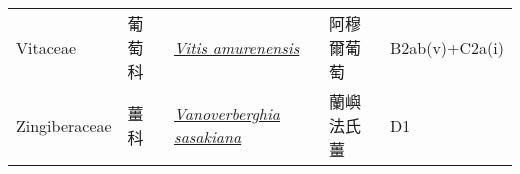 {\begin{longtable}{p{2.5cm}p{2.5cm}p{4.5cm}p{2.5cm}p{3cm}}
    Vitaceae & 葡萄科 & \href{http://www.theplantlist.org/tpl1.1/search?q=Vitis+amurenensis}{\textit{Vitis amurenensis} } & 阿穆爾葡萄 & B2ab(v)+C2a(i) \index{Vitis@\textit{Vitis}!amurenensis@\textit{amurenensis}}  \index{阿穆爾葡萄} \\
    Zingiberaceae & 薑科 & \href{http://www.theplantlist.org/tpl1.1/search?q=Vanoverberghia+sasakiana}{\textit{Vanoverberghia sasakiana} } & 蘭嶼法氏薑 & D1 \index{Vanoverberghia@\textit{Vanoverberghia}!sasakiana@\textit{sasakiana}}  \index{蘭嶼法氏薑} \\
    \bottomrule
        \end{longtable}
        }
    